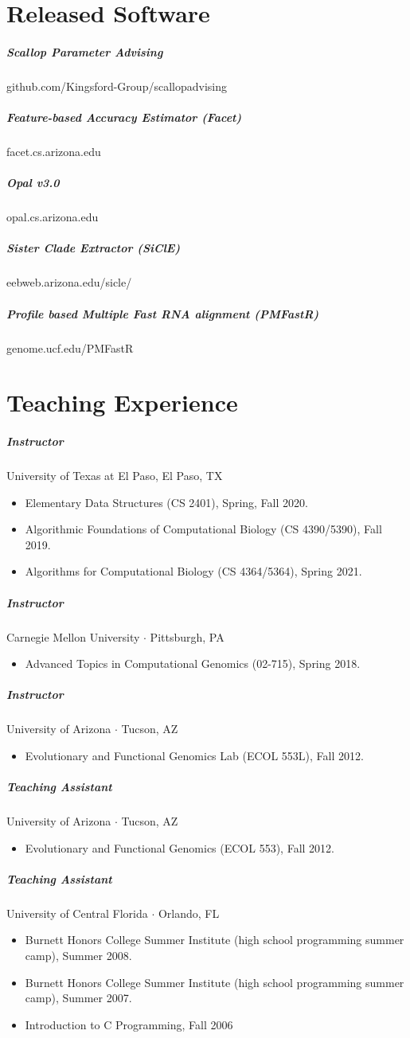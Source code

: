 \documentclass[10pt,letterpaper]{article}
\newcommand{\bigdot}{$\cdot$\xspace}
\begin{document}
\section*{Released Software}
\subparagraph{Scallop Parameter Advising}						github.com/Kingsford-Group/scallopadvising
\subparagraph{Feature-based Accuracy Estimator (Facet)} 			facet.cs.arizona.edu
\subparagraph{Opal v3.0}										opal.cs.arizona.edu 
\subparagraph{Sister Clade Extractor (SiClE)}						eebweb.arizona.edu/sicle/
\subparagraph{Profile based Multiple Fast RNA alignment (PMFastR)}	genome.ucf.edu/PMFastR 

\section*{Teaching Experience}

\subparagraph{Instructor}  University of Texas at El Paso, El Paso, TX
\begin{itemize}
	\item Elementary Data Structures (CS 2401), Spring, Fall 2020.
	\item Algorithmic Foundations of Computational Biology (CS 4390/5390), Fall 2019.
	\item Algorithms for Computational Biology (CS 4364/5364), Spring 2021.
\end{itemize}

\subparagraph{Instructor}  Carnegie Mellon University \bigdot Pittsburgh, PA
\begin{itemize}
    \item Advanced Topics in Computational Genomics (02-715), Spring 2018.
\end{itemize}

\subparagraph{Instructor} University of Arizona \bigdot Tucson, AZ
\begin{itemize}
    \item Evolutionary and Functional Genomics Lab (ECOL 553L), Fall 2012.
\end{itemize}

\subparagraph{Teaching Assistant}
University of Arizona \bigdot Tucson, AZ
\begin{itemize}
    \item Evolutionary and Functional Genomics (ECOL 553), Fall 2012.
\end{itemize}

\subparagraph{Teaching Assistant}
University of Central Florida \bigdot Orlando, FL
\begin{itemize}
    \item Burnett Honors College Summer Institute (high school programming summer camp), Summer 2008.
    \item Burnett Honors College Summer Institute (high school programming summer camp), Summer 2007.
    \item Introduction to C Programming, Fall 2006
\end{itemize}
\end{document}
